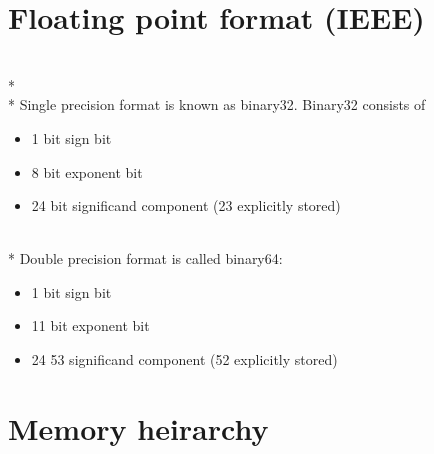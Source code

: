 \documentclass[letterpaper,10pt,titlepage]{article}
\begin{document}
\pagebreak

\section{Floating point format (IEEE)}

    \\*
    \\*
    Single precision format is known as binary32. Binary32 consists of 
    \begin{itemize}
        \item 1 bit sign bit
        \item 8 bit exponent bit
        \item 24 bit significand component (23 explicitly stored)
    \end{itemize}
    \\*
    Double precision format is called binary64:
    \begin{itemize}
        \item 1 bit sign bit
        \item 11 bit exponent bit
        \item 24 53 significand component (52 explicitly stored)
    \end{itemize}

\pagebreak

\section{Memory heirarchy}
\end{document}
